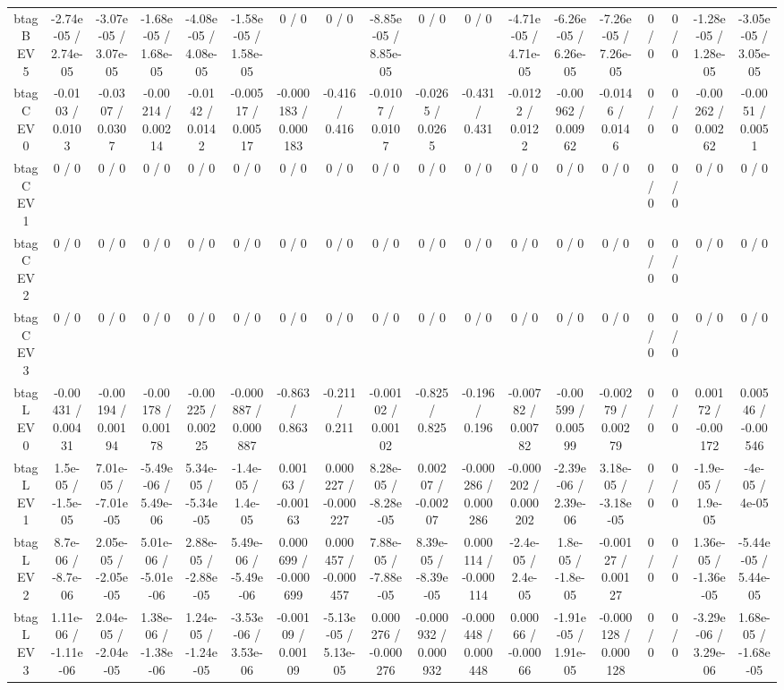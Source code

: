 \documentclass[10pt]{article}
\begin{document}
\begin{table}[htbp]
\begin{center}
\begin{tabular}{|c|c|c|c|c|c|c|c|c|c|c|c|c|c|c|c|c|c|}
  btag B EV 5 & -2.74e-05 / 2.74e-05 & -3.07e-05 / 3.07e-05 & -1.68e-05 / 1.68e-05 & -4.08e-05 / 4.08e-05 & -1.58e-05 / 1.58e-05 & 0 / 0 & 0 / 0 & -8.85e-05 / 8.85e-05 & 0 / 0 & 0 / 0 & -4.71e-05 / 4.71e-05 & -6.26e-05 / 6.26e-05 & -7.26e-05 / 7.26e-05 & 0 / 0 & 0 / 0 & -1.28e-05 / 1.28e-05 & -3.05e-05 / 3.05e-05 \\ 
  btag C EV 0 & -0.0103 / 0.0103 & -0.0307 / 0.0307 & -0.00214 / 0.00214 & -0.0142 / 0.0142 & -0.00517 / 0.00517 & -0.000183 / 0.000183 & -0.416 / 0.416 & -0.0107 / 0.0107 & -0.0265 / 0.0265 & -0.431 / 0.431 & -0.0122 / 0.0122 & -0.00962 / 0.00962 & -0.0146 / 0.0146 & 0 / 0 & 0 / 0 & -0.00262 / 0.00262 & -0.0051 / 0.0051 \\ 
  btag C EV 1 & 0 / 0 & 0 / 0 & 0 / 0 & 0 / 0 & 0 / 0 & 0 / 0 & 0 / 0 & 0 / 0 & 0 / 0 & 0 / 0 & 0 / 0 & 0 / 0 & 0 / 0 & 0 / 0 & 0 / 0 & 0 / 0 & 0 / 0 \\ 
  btag C EV 2 & 0 / 0 & 0 / 0 & 0 / 0 & 0 / 0 & 0 / 0 & 0 / 0 & 0 / 0 & 0 / 0 & 0 / 0 & 0 / 0 & 0 / 0 & 0 / 0 & 0 / 0 & 0 / 0 & 0 / 0 & 0 / 0 & 0 / 0 \\ 
  btag C EV 3 & 0 / 0 & 0 / 0 & 0 / 0 & 0 / 0 & 0 / 0 & 0 / 0 & 0 / 0 & 0 / 0 & 0 / 0 & 0 / 0 & 0 / 0 & 0 / 0 & 0 / 0 & 0 / 0 & 0 / 0 & 0 / 0 & 0 / 0 \\ 
  btag L EV 0 & -0.00431 / 0.00431 & -0.00194 / 0.00194 & -0.00178 / 0.00178 & -0.00225 / 0.00225 & -0.000887 / 0.000887 & -0.863 / 0.863 & -0.211 / 0.211 & -0.00102 / 0.00102 & -0.825 / 0.825 & -0.196 / 0.196 & -0.00782 / 0.00782 & -0.00599 / 0.00599 & -0.00279 / 0.00279 & 0 / 0 & 0 / 0 & 0.00172 / -0.00172 & 0.00546 / -0.00546 \\ 
  btag L EV 1 & 1.5e-05 / -1.5e-05 & 7.01e-05 / -7.01e-05 & -5.49e-06 / 5.49e-06 & 5.34e-05 / -5.34e-05 & -1.4e-05 / 1.4e-05 & 0.00163 / -0.00163 & 0.000227 / -0.000227 & 8.28e-05 / -8.28e-05 & 0.00207 / -0.00207 & -0.000286 / 0.000286 & -0.000202 / 0.000202 & -2.39e-06 / 2.39e-06 & 3.18e-05 / -3.18e-05 & 0 / 0 & 0 / 0 & -1.9e-05 / 1.9e-05 & -4e-05 / 4e-05 \\ 
  btag L EV 2 & 8.7e-06 / -8.7e-06 & 2.05e-05 / -2.05e-05 & 5.01e-06 / -5.01e-06 & 2.88e-05 / -2.88e-05 & 5.49e-06 / -5.49e-06 & 0.000699 / -0.000699 & 0.000457 / -0.000457 & 7.88e-05 / -7.88e-05 & 8.39e-05 / -8.39e-05 & 0.000114 / -0.000114 & -2.4e-05 / 2.4e-05 & 1.8e-05 / -1.8e-05 & -0.00127 / 0.00127 & 0 / 0 & 0 / 0 & 1.36e-05 / -1.36e-05 & -5.44e-05 / 5.44e-05 \\ 
  btag L EV 3 & 1.11e-06 / -1.11e-06 & 2.04e-05 / -2.04e-05 & 1.38e-06 / -1.38e-06 & 1.24e-05 / -1.24e-05 & -3.53e-06 / 3.53e-06 & -0.00109 / 0.00109 & -5.13e-05 / 5.13e-05 & 0.000276 / -0.000276 & -0.000932 / 0.000932 & -0.000448 / 0.000448 & 0.00066 / -0.00066 & -1.91e-05 / 1.91e-05 & -0.000128 / 0.000128 & 0 / 0 & 0 / 0 & -3.29e-06 / 3.29e-06 & 1.68e-05 / -1.68e-05 \\ 

\end{tabular}
\end{center}
\end{table}
\end{document}
